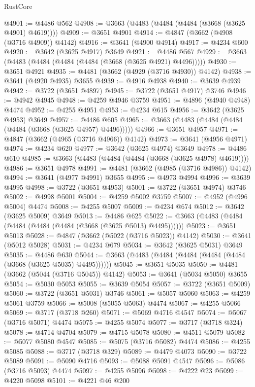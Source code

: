 \begin{lexlean}{RustCore}
\begin{coremodule}
@4901 := @4486 @562
@4908 := @3663 (@4483 (@4484 (@4484 (@3668 (@3625 @4901) @4619))))
@4909 := @3651 @4901
@4914 := @4847 (@3662 (@4908 (@3716 @4909)) @4142)
@4916 := @3641 (@4900 @4914)
@4917 := @4234 @600
@4920 := @3642 (@3625 @4917) @3649
@4921 := @4486 @567
@4929 := @3663 (@4483 (@4484 (@4484 (@4484 (@3668 (@3625 @4921) @4496)))))
@4930 := @3651 @4921
@4935 := @4481 (@3662 (@4929 (@3716 @4930)) @4142)
@4938 := @3641 (@4920 @4935) @3655
@4939 := @4916 @4938
@4940 := @3639 @4939
@4942 := @3722 (@3651 @4897)
@4945 := @3722 (@3651 @4917) @3746
@4946 := @4942 @4945
@4948 := @4259 @4946 @3759
@4951 := @4896 (@4940 @4948) @4474
@4952 := @4255 @4951
@4953 := @4234 @615
@4956 := @3642 (@3625 @4953) @3649
@4957 := @4486 @605
@4965 := @3663 (@4483 (@4484 (@4484 (@4484 (@3668 (@3625 @4957) @4496)))))
@4966 := @3651 @4957
@4971 := @4847 (@3662 (@4965 (@3716 @4966)) @4142)
@4973 := @3641 (@4956 @4971)
@4974 := @4234 @620
@4977 := @3642 (@3625 @4974) @3649
@4978 := @4486 @610
@4985 := @3663 (@4483 (@4484 (@4484 (@3668 (@3625 @4978) @4619))))
@4986 := @3651 @4978
@4991 := @4481 (@3662 (@4985 (@3716 @4986)) @4142)
@4994 := @3641 (@4977 @4991) @3655
@4995 := @4973 @4994
@4996 := @3639 @4995
@4998 := @3722 (@3651 @4953)
@5001 := @3722 (@3651 @4974) @3746
@5002 := @4998 @5001
@5004 := @4259 @5002 @3759
@5007 := @4952 (@4996 @5004) @4474
@5008 := @4255 @5007
@5009 := @4234 @674
@5012 := @3642 (@3625 @5009) @3649
@5013 := @4486 @625
@5022 := @3663 (@4483 (@4484 (@4484 (@4484 (@4484 (@3668 (@3625 @5013) @4495))))))
@5023 := @3651 @5013
@5028 := @4847 (@3662 (@5022 (@3716 @5023)) @4142)
@5030 := @3641 (@5012 @5028)
@5031 := @4234 @679
@5034 := @3642 (@3625 @5031) @3649
@5035 := @4486 @630
@5044 := @3663 (@4483 (@4484 (@4484 (@4484 (@4484 (@3668 (@3625 @5035) @4495))))))
@5045 := @3651 @5035
@5050 := @4481 (@3662 (@5044 (@3716 @5045)) @4142)
@5053 := @3641 (@5034 @5050) @3655
@5054 := @5030 @5053
@5055 := @3639 @5054
@5057 := @3722 (@3651 @5009)
@5060 := @3722 (@3651 @5031) @3746
@5061 := @5057 @5060
@5063 := @4259 @5061 @3759
@5066 := @5008 (@5055 @5063) @4474
@5067 := @4255 @5066
@5069 := @3717 (@3718 @260)
@5071 := @5069 @4716 @4547
@5074 := @5067 (@3716 @5071) @4474
@5075 := @4255 @5074
@5077 := @3717 (@3718 @324)
@5078 := @4714 @4704
@5079 := @4715 @5078
@5080 := @4511 @5079
@5082 := @5077 @5080 @4547
@5085 := @5075 (@3716 @5082) @4474
@5086 := @4255 @5085
@5088 := @3717 (@3718 @329)
@5089 := @4479 @4073
@5090 := @3722 @5089
@5091 := @5090 @4716
@5093 := @5088 @5091 @4547
@5096 := @5086 (@3716 @5093) @4474
@5097 := @4255 @5096
@5098 := @4222 @23
@5099 := @4220 @5098
@5101 := @4221 @46 @200

\end{coremodule}
\end{lexlean}
